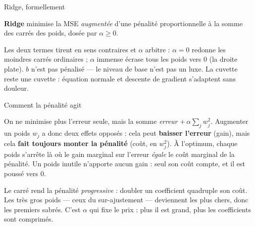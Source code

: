 \documentclass[aspectratio=169,11pt]{beamer}
\begin{document}
\begin{frame}{Ridge, formellement}
\begin{ucaddef}[Définition]
{\small \textbf{Ridge} minimise la MSE \emph{augmentée} d'une pénalité proportionnelle à la somme des carrés des poids, dosée par $\alpha \geq 0$.}
\end{ucaddef}
{\small Les deux termes tirent en sens contraires et $\alpha$ arbitre : $\alpha = 0$ redonne les moindres carrés ordinaires ; $\alpha$ immense écrase tous les poids vers $0$ (la droite plate). $b$ n'est pas pénalisé — le niveau de base n'est pas un luxe. La cuvette reste une cuvette : équation normale et descente de gradient s'adaptent sans douleur.}
\end{frame}

\begin{frame}{Comment la pénalité agit}
\begin{ucadfront}
{\small On ne minimise plus l'erreur seule, mais la somme \emph{erreur} $+\,\alpha\sum_j w_j^2$. Augmenter un poids $w_j$ a donc deux effets opposés : cela peut \textbf{baisser l'erreur} (gain), mais cela \textbf{fait toujours monter la pénalité} (coût, en $w_j^2$). À l'optimum, chaque poids s'arrête là où le gain marginal sur l'erreur \emph{égale} le coût marginal de la pénalité. Un poids inutile n'apporte aucun gain : seul son coût compte, et il est poussé vers $0$.}
\end{ucadfront}
{\small Le carré rend la pénalité \emph{progressive} : doubler un coefficient quadruple son coût. Les très gros poids — ceux du sur-ajustement — deviennent les plus chers, donc les premiers sabrés. C'est $\alpha$ qui fixe le prix : plus il est grand, plus les coefficients sont comprimés.}
\end{frame}
\end{document}
